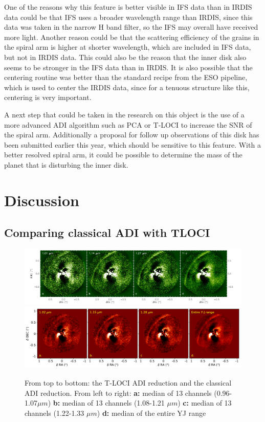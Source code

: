 \documentclass[twoside,single,12pt]{lion-msc}
\begin{document}
One of the reasons why this feature is better visible in IFS data than in IRDIS data could be that IFS uses a broader wavelength range than IRDIS, since this data was taken in the narrow H band filter, so the IFS may overall have received more light. Another reason could be that the scattering efficiency of the grains in the spiral arm is higher at shorter wavelength, which are included in IFS data, but not in IRDIS data. This could also be the reason that the inner disk also seems to be stronger in the IFS data than in IRDIS. It is also possible that the centering routine was better than the standard recipe from the ESO pipeline, which is used to center the IRDIS data, since for a tenuous structure like this, centering is very important. 
\bigskip

A next step that could be taken in the research on this object is the use of a more advanced ADI algorithm such as PCA or T-LOCI to increase the SNR of the spiral arm. Additionally a proposal for follow up observations of this disk has been submitted earlier this year, which should be sensitive to this feature. With a better resolved spiral arm, it could be possible to determine the mass of the planet that is disturbing the inner disk.

\chapter{Discussion}
\section{Comparing classical ADI with TLOCI}
\begin{figure}[!b]
\centering
\vspace{-0.3cm}
\includegraphics[trim={0.3cm 0cm 1.2cm 0cm},clip,width = .985\textwidth]{ifsjos}
\includegraphics[trim={0cm 0cm 0cm 0cm},clip,width = \textwidth]{ADIwavelplot}
\caption{From top to bottom: the T-LOCI ADI reduction and the classical ADI reduction. From left to right: \textbf{a:} median of 13 channels (0.96-1.07$\mu m$) \textbf{b:} median of 13 channels (1.08-1.21 $\mu m$) \textbf{c:} median of 13 channels (1.22-1.33 $\mu m$) \textbf{d:} median of the entire YJ range}
\label{fig:coloroverpos}
\vspace{-0.5cm}
\end{figure}
\end{document}
